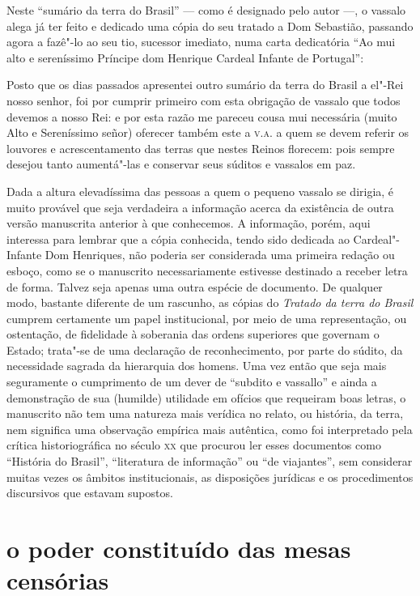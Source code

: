 Neste ``sumário da terra do Brasil'' --- como é
designado pelo autor ---, o vassalo alega já ter feito e dedicado uma
cópia do seu tratado a Dom Sebastião, passando agora a fazê"-lo ao seu
tio, sucessor imediato, numa carta dedicatória ``Ao mui
alto e sereníssimo Príncipe dom Henrique Cardeal Infante de Portugal'':
\begin{hedraquote}
Posto que os dias passados apresentei outro sumário da terra do Brasil a
el"-Rei nosso senhor, foi por cumprir primeiro com esta obrigação de
vassalo que todos devemos a nosso Rei: e por esta razão me pareceu
cousa mui necessária (muito Alto e Sereníssimo señor) oferecer também
este a \textsc{v.a.} a quem se devem referir os louvores e acrescentamento das
terras que nestes Reinos florecem: pois sempre desejou tanto
aumentá"-las e conservar seus súditos e vassalos em paz.
\end{hedraquote}

Dada a altura elevadíssima das pessoas a quem o pequeno vassalo se
dirigia, é muito provável que seja verdadeira a informação acerca da
existência de outra versão manuscrita anterior à que conhecemos. A
informação, porém, aqui interessa para lembrar que a cópia conhecida,
tendo sido dedicada ao Cardeal"-Infante Dom Henriques, não poderia ser
considerada uma primeira redação ou esboço, como se o manuscrito
necessariamente estivesse destinado a receber letra de forma. Talvez
seja apenas uma outra espécie de documento. De qualquer modo, bastante
diferente de um rascunho, as cópias do \textit{Tratado da terra do Brasil}
cumprem certamente um papel institucional, por meio de uma
representação, ou ostentação, de fidelidade à soberania das ordens
superiores que governam o Estado; trata"-se de uma declaração de
reconhecimento, por parte do súdito, da necessidade sagrada da
hierarquia dos homens. Uma vez então que seja mais seguramente o
cumprimento de um dever de ``subdito e vassallo'' e ainda a demonstração de sua (humilde)
utilidade em ofícios que requeiram boas letras, o manuscrito não tem
uma natureza mais verídica no relato, ou história, da terra, nem
significa uma observação empírica mais autêntica, como foi interpretado
pela crítica historiográfica no século \textsc{xx} que procurou ler esses
documentos como ``História do Brasil'', ``literatura de informação'' ou
``de viajantes'', sem considerar muitas vezes os âmbitos institucionais, 
as disposições jurídicas e os procedimentos discursivos que estavam supostos.

\section{o poder constituído das mesas censórias}

